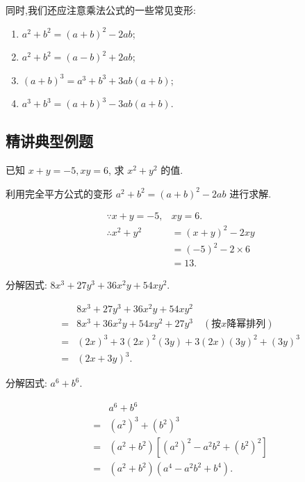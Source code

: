同时,我们还应注意乘法公式的一些常见变形:
\begin{enumerate}
	\item $a^2+b^2=(a+b)^2-2 a b$;
	\item $a^2+b^2=(a-b)^2+2 a b$;
	\item $(a+b)^3=a^3+b^3+3 a b(a+b)$;
	\item $a^3+b^3=(a+b)^3-3 a b(a+b)$.
\end{enumerate}

\subsection{精讲典型例题}
\begin{example}
	已知 $x+y=-5, xy=6$, 求 $x^2+y^2$ 的值.
\end{example}
\begin{analysis}
	利用完全平方公式的变形 $a^2+b^2=(a+b)^2-2 a b$ 进行求解.
\end{analysis}
\begin{solution}
	\begin{align*}
		\because x+y=-5,   & x y=6.             \\
		\therefore x^2+y^2 & =(x+y)^2-2 x y     \\
		                   & =(-5)^2-2 \times 6 \\
		                   & =13 .
	\end{align*}
\end{solution}

\begin{example}
	分解因式: $8 x^3+27 y^3+36 x^2 y+54 x y^2$.
\end{example}
\begin{solution}
	\begin{align}
		  & 8 x^3+27 y^3+36 x^2 y+54 x y^2                                   \\
		= & 8 x^3+36 x^2 y+54 x y^2+27 y^3 \quad (\text{按}x\text{降幂排列}) \\
		= & (2 x)^3+3(2 x)^2(3 y)+3(2 x)(3 y)^2+(3 y)^3                      \\
		= & (2 x+3 y)^3 .
	\end{align}
\end{solution}

\begin{example}
	分解因式: $a^6+b^6$.
\end{example}
\begin{solution}
	\begin{align}
		  & a^6+b^6                                                                        \\
		= & \left(a^2\right)^3+\left(b^2\right)^3                                          \\
		= & \left(a^2+b^2\right)\left[\left(a^2\right)^2-a^2 b^2+\left(b^2\right)^2\right] \\
		= & \left(a^2+b^2\right)\left(a^4-a^2 b^2+b^4\right) .
	\end{align}
\end{solution}


